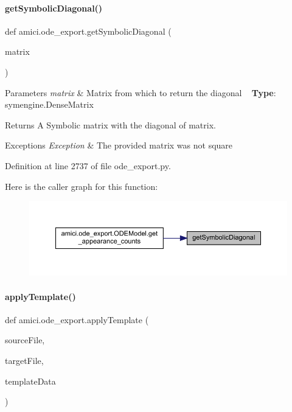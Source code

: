\paragraph{\texorpdfstring{getSymbolicDiagonal()}{getSymbolicDiagonal()}}
{\footnotesize\ttfamily def amici.\+ode\+\_\+export.\+get\+Symbolic\+Diagonal (\begin{DoxyParamCaption}\item[{}]{matrix }\end{DoxyParamCaption})}


\begin{DoxyParams}{Parameters}
{\em matrix} & Matrix from which to return the diagonal ~\newline
{\bfseries{Type}}\+: symengine.\+Dense\+Matrix\\
\hline
\end{DoxyParams}
\begin{DoxyReturn}{Returns}
A Symbolic matrix with the diagonal of {\ttfamily matrix}.
\end{DoxyReturn}

\begin{DoxyExceptions}{Exceptions}
{\em Exception} & The provided matrix was not square \\
\hline
\end{DoxyExceptions}


Definition at line 2737 of file ode\+\_\+export.\+py.

Here is the caller graph for this function\+:
\nopagebreak
\begin{figure}[H]
\begin{center}
\leavevmode
\includegraphics[width=350pt]{namespaceamici_1_1ode__export_aed240175cce2aa528fe24d1486c52559_icgraph}
\end{center}
\end{figure}
\mbox{\label{namespaceamici_1_1ode__export_af4b013340d08cdef3247601d2bf0b62f}} 
\paragraph{\texorpdfstring{applyTemplate()}{applyTemplate()}}
{\footnotesize\ttfamily def amici.\+ode\+\_\+export.\+apply\+Template (\begin{DoxyParamCaption}\item[{}]{source\+File,  }\item[{}]{target\+File,  }\item[{}]{template\+Data }\end{DoxyParamCaption})}


